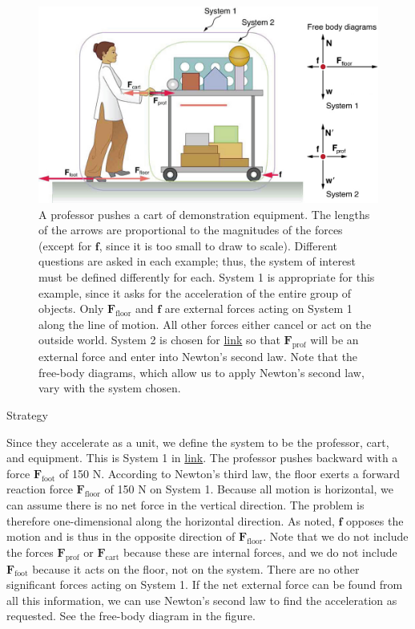 \documentclass[
]{book}
\newenvironment{tinysection}{}{}
\begin{document}
\begin{figure}
\hypertarget{import-auto-id2324690}{%
\centering
\includegraphics{images/Figure_04_04_02.jpg}
\caption{A professor pushes a cart of demonstration equipment. The lengths of
the arrows are proportional to the magnitudes of the forces (except for
\(\textbf{f}{}\), since it is too small to draw to scale). Different
questions are asked in each example; thus, the system of interest must
be defined differently for each. System 1 is appropriate for this
example, since it asks for the acceleration of the entire group of
objects. Only \(\textbf{F}_{\text{floor}}{}\) and \(\textbf{f}{}\) are
external forces acting on System 1 along the line of motion. All other
forces either cancel or act on the outside world. System 2 is chosen for
\protect\hyperlink{fs-id2092526}{link} so that
\(\textbf{F}_{\text{prof}}{}\) will be an external force and enter into
Newton's second law. Note that the free-body diagrams, which allow us to
apply Newton's second law, vary with the system
chosen.}\label{import-auto-id2324690}
}
\end{figure}

\begin{tinysection}

{Strategy}

\end{tinysection}

Since they accelerate as a unit, we define the system to be the
professor, cart, and equipment. This is System 1 in
\protect\hyperlink{import-auto-id2324690}{link}. The professor
pushes backward with a force \(\textbf{F}_{\text{foot}}{}\) of 150 N.
According to Newton's third law, the floor exerts a forward reaction
force \(\textbf{F}_{\text{floor}}{}\) of 150 N on System 1. Because all
motion is horizontal, we can assume there is no net force in the
vertical direction. The problem is therefore one-dimensional along the
horizontal direction. As noted, \(\textbf{f}{}\) opposes the motion and is
thus in the opposite direction of
\emph{}\(\textbf{F}_{\text{floor}}{}\). Note that
we do not include the forces \(\textbf{F}_{\text{prof}}{}\) or
\(\textbf{F}_{\text{cart}}{}\) because these are internal forces, and we
do not include \(\textbf{F}_{\text{foot}}{}\) because it acts on the
floor, not on the system. There are no other significant forces acting
on System 1. If the net external force can be found from all this
information, we can use Newton's second law to find the acceleration as
requested. See the free-body diagram in the figure.
\end{document}

